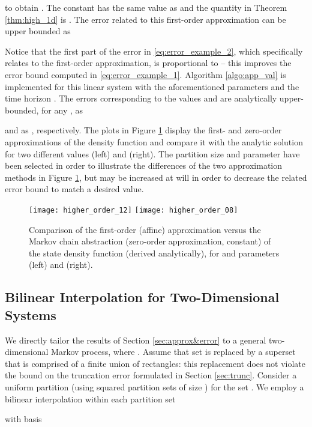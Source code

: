 \documentclass{LMCS}
\begin{document}
to obtain . 
The constant  has the same value as  and the quantity  in Theorem \ref{thm:high_1d} is . The error related to this first-order approximation can be upper bounded as

Notice that the first part of the error in \eqref{eq:error_example_2}, 
which specifically relates to the first-order approximation,  
is proportional to  -- this improves the error bound computed in \eqref{eq:error_example_1}.
Algorithm \ref{algo:app_val} is implemented for this linear system with the aforementioned parameters
 and the time horizon . 
The errors corresponding to the values  and  are analytically upper-bounded, 
for any , as 

and as ,
respectively.  
The plots in Figure \ref{fig:higher_order_density} display the first- and zero-order approximations of the density function  and compare it with the analytic solution for two different values  (left) and  (right). 
The partition size  and parameter  have been selected in order to illustrate the differences of the two approximation methods in Figure \ref{fig:higher_order_density},
but may be increased at will in order to decrease the related error bound to match a desired value. 

\begin{figure}
\centering
\texttt{[image: higher\_order\_12]}
\texttt{[image: higher\_order\_08]}
\caption{Comparison of the first-order (affine) approximation  
versus the Markov chain abstraction (zero-order approximation, constant)  of the state density function  (derived analytically), 
for  and parameters  (left) and  (right).} 
\label{fig:higher_order_density}
\end{figure}

\subsection{Bilinear Interpolation for Two-Dimensional Systems}

We directly tailor the results of Section \ref{sec:approx&error} to a general two-dimensional Markov process, 
where . 
Assume that set  is replaced by a superset that is comprised of a finite union of rectangles: 
this replacement does not violate the bound on the truncation error formulated in Section \ref{sec:trunc}.   
Consider a uniform partition (using squared partition sets of size ) for the set .  
We employ a bilinear interpolation within each partition set

with basis
\end{document}
